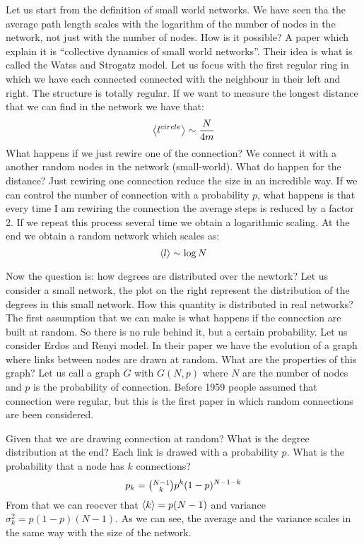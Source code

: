 \documentclass[../main/main.tex]{subfiles}
\begin{document}

Let us start from the definition of small world networks. We have seen tha the average path length scales with the logarithm of the number of nodes in the network, not just with the number of nodes. How is it possible? A paper which explain it is “collective dynamics of small world networks”. Their idea is what is called the Watss and Strogatz model. Let us focus with the first regular ring in which we have each connected connected with the neighbour in their left and right. The structure is totally regular. If we want to measure the longest distance that we can find in the network we have that:
\begin{equation*}
  \expval{l^{circle}} \sim \frac{N}{4 m}
\end{equation*}
What happens if we just rewire one of the connection? We connect it with a another random nodes in the network (small-world). What do happen for the distance? Just rewiring one connection reduce the size in an incredible way. If we can control the number of connection with a probability \( p \), what happens is that every time I am rewiring the connection the average steps is reduced by a factor 2. If we repeat this process several time we obtain a logarithmic scaling. At the end we obtain a random network which scales as:
\begin{equation*}
  \expval{l} \sim \log{N}
\end{equation*}

Now the question is: how degrees are distributed over the newtork? Let us consider a small network, the plot on the right represent the distribution of the degrees in this small network. How this quantity is distributed in real networks?
The first assumption that we can make is what happens if the connection are built at random. So there is no rule behind it, but a certain probability.
Let us consider Erdos and Renyi model. In their paper we have the evolution of a graph where links between nodes are drawn at random. What are the properties of this graph?
Let us call a graph \( G \) with \( G(N,p) \) where \( N \) are the number of nodes and \( p \) is the probability of connection.
Before 1959 people assumed that connection were regular, but this is the first paper in which random connections are been considered.

Given that we are drawing connection at random? What is the degree distribution at the end? Each link is drawed with a probability \( p \). What is the probability that a node has \( k \) connections?
\begin{equation*}
  p_k = \qty(\substack{N-1 \\ k} ) p^k (1-p)^{N-1-k}
\end{equation*}
From that we can reocver that \( \expval{k} = p(N-1)  \) and variance \( \sigma _k^2 = p(1-p)(N-1) \). As we can see, the average and the variance scales in the same way with the size of the network.
\end{document}

